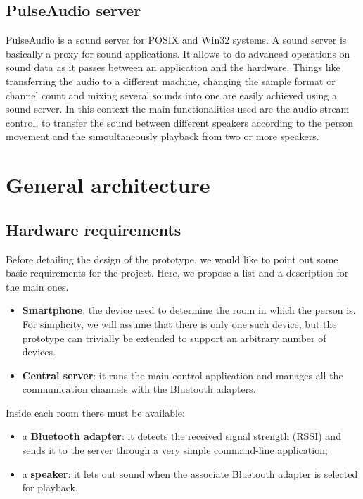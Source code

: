 \documentclass[conference]{IEEEtran}
\begin{document}
\subsection{PulseAudio server}
PulseAudio is a sound server for POSIX and Win32 systems. A sound server is basically a proxy for sound applications. It allows to do advanced operations on sound data as it passes between an application and the hardware. Things like transferring the audio to a different machine, changing the sample format or channel count and mixing several sounds into one are easily achieved using a sound server. In this context the main functionalities used are the audio stream control, to transfer the sound between different speakers according to the person movement and the simoultaneously playback from two or more speakers.

\section{General architecture}

\subsection{Hardware requirements}
\label{hardware-requirements}
Before detailing the design of the prototype, we would like to point out some basic requirements for the project. Here, we propose a list and a description for the main ones.
\begin{itemize}
\item{\textbf{Smartphone}:} the device used to determine the room in which the person is. For simplicity, we will assume that there is only one such device, but the prototype can trivially be extended to support an arbitrary number of devices.
\item{\textbf{Central server}:} it runs the main control application and manages all the communication channels with the Bluetooth adapters.
\end{itemize}
Inside each room there must be available:
\begin{itemize}
\item{a \textbf{Bluetooth adapter}:} it detects the received signal strength (RSSI) and sends it to the server through a very simple command-line application;
\item{a \textbf{speaker}:} it lets out sound when the associate Bluetooth adapter is selected for playback.
\end{itemize}
\end{document}
